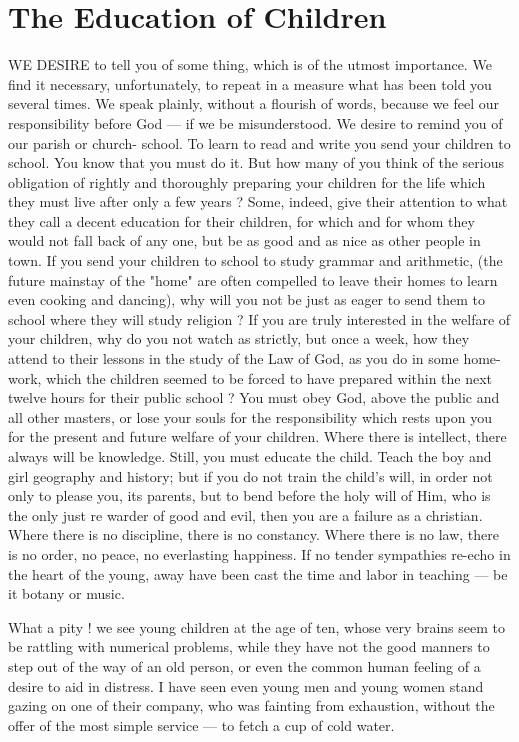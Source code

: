 \chapter{The Education of Children}

WE DESIRE to tell you of some thing, 
which is of the utmost importance. We 
find it necessary, unfortunately, to repeat in a 
measure what has been told you several times. 
We speak plainly, without a flourish of words, 
because we feel our responsibility before God — 
if we be misunderstood. We desire to remind 
you of our parish or church- school. To learn 
to read and write you send your children to 
school. You know that you must do it. But 
how many of you think of the serious obligation 
of rightly and thoroughly preparing your 
children for the life which they must live after 
only a few years ? Some, indeed, give their 
attention to what they call a decent education 
for their children, for which and for whom they 
would not fall back of any one, but be as good 
and as nice as other people in town. If you 
send your children to school to study grammar 
and arithmetic, (the future mainstay of the 
"home" are often compelled to leave their homes 
to learn even cooking and dancing), why will 
you not be just as eager to send them to school 
where they will study religion ? If you are 
truly interested in the welfare of your children, 
why do you not watch as strictly, but once a week, 
how they attend to their lessons in the study of 
the Law of God, as you do in some home-work, 
which the children seemed to be forced to have 
prepared within the next twelve hours for their 
public school ? You must obey God, above the 
public and all other masters, or lose your souls 
for the responsibility which rests upon you for 
the present and future welfare of your children. 
Where there is intellect, there always will be 
knowledge. Still, you must educate the child. 
Teach the boy and girl geography and history; 
but if you do not train the child's will, in order 
not only to please you, its parents, but to bend 
before the holy will of Him, who is the only 
just re warder of good and evil, then you are a 
failure as a christian. Where there is no discipline,
there is no constancy. Where there is 
no law, there is no order, no peace, no everlasting
happiness. If no tender sympathies re-echo 
in the heart of the young, away have been cast 
the time and labor in teaching — be it botany or 
music.

What a pity ! we see young children at the 
age of ten, whose very brains seem to be rattling 
with numerical problems, while they have not 
the good manners to step out of the way of an 
old person, or even the common human feeling 
of a desire to aid in distress. I have seen even 
young men and young women stand gazing on 
one of their company, who was fainting from 
exhaustion, without the offer of the most simple 
service — to fetch a cup of cold water. 

